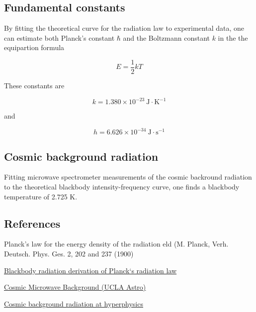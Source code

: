 

\subsection{Fundamental constants}

By fitting the theoretical curve for the radiation law to experimental data, one can estimate both Planck's constant $\hbar$ and the Boltzmann constant $k$ in the the equipartion formula 

$$
E = \frac{1}{2} kT
$$

These constants are

$$ k = 1.380 \times 10^{-23}\ \text{J}\cdot\text{K}^{-1}$$

and 

$$ h = 6.626 \times 10^{-34}\ \text{J}\cdot\text{s}^{-1}$$

\subsection{Cosmic background radiation}

Fitting microwave spectrometer measurements of the cosmic backround radiation to the theoretical blackbody intensity-frequency curve, one finds a blackbody temperature of 2.725 K. 



\subsection{References}

Planck's law for the energy density of the radiation eld (M.
Planck, Verh. Deutsch. Phys. Ges. 2, 202 and 237 (1900)

\href{https://www.chemie.unibas.ch/~tulej/Spectroscopy_related_aspects/Lecture7_Spec_Rel_Asp.pdf}{Blackbody radiation
derivation of Planck‘s radiation law}

\href{http://www.astro.ucla.edu/~wright/CMB.html}{Cosmic Microwave Background (UCLA Astro)}

\href{http://hyperphysics.phy-astr.gsu.edu/hbase/bkg3k.html}{Cosmic background radiation at hyperphysics}



